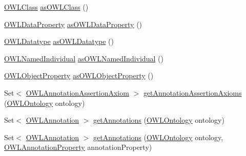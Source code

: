 \begin{DoxyCompactItemize}
\item 
\hyperlink{interfaceorg_1_1semanticweb_1_1owlapi_1_1model_1_1_o_w_l_class}{O\-W\-L\-Class} \hyperlink{classuk_1_1ac_1_1manchester_1_1cs_1_1owl_1_1owlapi_1_1_o_w_l_annotation_property_impl_ad454c52addbb080a321a0139b0b21f24}{as\-O\-W\-L\-Class} ()
\item 
\hyperlink{interfaceorg_1_1semanticweb_1_1owlapi_1_1model_1_1_o_w_l_data_property}{O\-W\-L\-Data\-Property} \hyperlink{classuk_1_1ac_1_1manchester_1_1cs_1_1owl_1_1owlapi_1_1_o_w_l_annotation_property_impl_ad98d177ff6808cc6663e1a7bedb5cdaf}{as\-O\-W\-L\-Data\-Property} ()
\item 
\hyperlink{interfaceorg_1_1semanticweb_1_1owlapi_1_1model_1_1_o_w_l_datatype}{O\-W\-L\-Datatype} \hyperlink{classuk_1_1ac_1_1manchester_1_1cs_1_1owl_1_1owlapi_1_1_o_w_l_annotation_property_impl_acc16604e6e2c040d7e2785ba51e549e6}{as\-O\-W\-L\-Datatype} ()
\item 
\hyperlink{interfaceorg_1_1semanticweb_1_1owlapi_1_1model_1_1_o_w_l_named_individual}{O\-W\-L\-Named\-Individual} \hyperlink{classuk_1_1ac_1_1manchester_1_1cs_1_1owl_1_1owlapi_1_1_o_w_l_annotation_property_impl_a5cff7991ec80a00bc6740ae6cdf57e29}{as\-O\-W\-L\-Named\-Individual} ()
\item 
\hyperlink{interfaceorg_1_1semanticweb_1_1owlapi_1_1model_1_1_o_w_l_object_property}{O\-W\-L\-Object\-Property} \hyperlink{classuk_1_1ac_1_1manchester_1_1cs_1_1owl_1_1owlapi_1_1_o_w_l_annotation_property_impl_a23c1a9ac8ef513096a208f4ee298c41a}{as\-O\-W\-L\-Object\-Property} ()
\item 
Set$<$ \hyperlink{interfaceorg_1_1semanticweb_1_1owlapi_1_1model_1_1_o_w_l_annotation_assertion_axiom}{O\-W\-L\-Annotation\-Assertion\-Axiom} $>$ \hyperlink{classuk_1_1ac_1_1manchester_1_1cs_1_1owl_1_1owlapi_1_1_o_w_l_annotation_property_impl_ab5d12af91fa852696173317463b68cae}{get\-Annotation\-Assertion\-Axioms} (\hyperlink{interfaceorg_1_1semanticweb_1_1owlapi_1_1model_1_1_o_w_l_ontology}{O\-W\-L\-Ontology} ontology)
\item 
Set$<$ \hyperlink{interfaceorg_1_1semanticweb_1_1owlapi_1_1model_1_1_o_w_l_annotation}{O\-W\-L\-Annotation} $>$ \hyperlink{classuk_1_1ac_1_1manchester_1_1cs_1_1owl_1_1owlapi_1_1_o_w_l_annotation_property_impl_a165ab62f952df38770264dbeab04e64a}{get\-Annotations} (\hyperlink{interfaceorg_1_1semanticweb_1_1owlapi_1_1model_1_1_o_w_l_ontology}{O\-W\-L\-Ontology} ontology)
\item 
Set$<$ \hyperlink{interfaceorg_1_1semanticweb_1_1owlapi_1_1model_1_1_o_w_l_annotation}{O\-W\-L\-Annotation} $>$ \hyperlink{classuk_1_1ac_1_1manchester_1_1cs_1_1owl_1_1owlapi_1_1_o_w_l_annotation_property_impl_a6954e7a8d9d93fbcfb345a4849bad823}{get\-Annotations} (\hyperlink{interfaceorg_1_1semanticweb_1_1owlapi_1_1model_1_1_o_w_l_ontology}{O\-W\-L\-Ontology} ontology, \hyperlink{interfaceorg_1_1semanticweb_1_1owlapi_1_1model_1_1_o_w_l_annotation_property}{O\-W\-L\-Annotation\-Property} annotation\-Property)

\end{DoxyCompactItemize}
